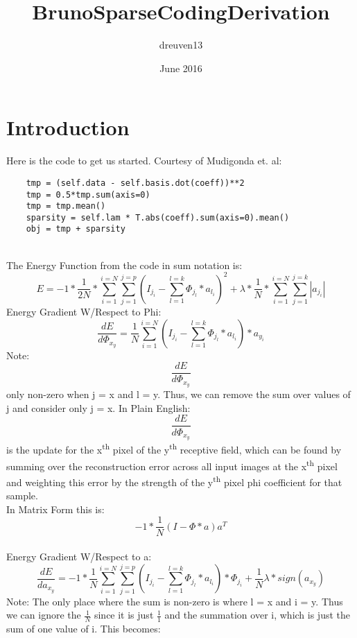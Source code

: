 \documentclass{article}
\title{BrunoSparseCodingDerivation}
\author{dreuven13 }
\date{June 2016}
\begin{document}
\maketitle

\section{Introduction}
Here is the code to get us started. Courtesy of Mudigonda et. al:
\begin{lstlisting}
    tmp = (self.data - self.basis.dot(coeff))**2
    tmp = 0.5*tmp.sum(axis=0)
    tmp = tmp.mean()
    sparsity = self.lam * T.abs(coeff).sum(axis=0).mean()
    obj = tmp + sparsity
\end{lstlisting}\\
\newcommand{\ErrorFunc}{\sum_{j=1}^{j=p}(I_j_i - \sum_{l=1}^{l=k}\Phi_j_l * a_l_i)}
\newcommand{\ErrFSinJ}{(I_j_i - \sum_{l=1}^{l=k}\Phi_j_l * a_l_i)}
The Energy Function from the code in sum notation is:
\begin{equation}
    E = -1 * \frac{1}{2N} *  \sum_{i=1}^{i=N}\ErrorFunc^2  + \lambda * \frac{1}{N} *  \sum_{i=1}^{i=N}\sum_{j=1}^{j=k}|a_j_i|
\end{equation}
Energy Gradient W/Respect to Phi: \\
\begin{equation}
    \frac{dE}{d\Phi_x_y} = \frac{1}{N}\sum_{i=1}^{i=N}\ErrFSinJ * a_y_i
\end{equation}
Note:  \[\frac{dE}{d\Phi_x_y}\] only non-zero when j = x and l = y. Thus, we can remove the sum over values of j and consider only j = x.
In Plain English:\\
\[\frac{dE}{d\Phi_x_y}\] is the update for the x\textsuperscript{th} pixel of the y\textsuperscript{th} receptive field, which can be found by summing over the reconstruction error across all input images at the x\textsuperscript{th} pixel and weighting this error by the strength of the y\textsuperscript{th} pixel phi coefficient for that sample.\\
In Matrix Form this is:
\begin{equation}
    -1 * \frac{1}{N}(I - \Phi * a)a^T
\end{equation}
\\
Energy Gradient W/Respect to a:
\begin{equation}
    \frac{dE}{da_x_y} = -1 * \frac{1}{N}\sum_{i=1}^{i=N}\ErrorFunc*\Phi_j_i + \frac{1}{N}\lambda * sign(a_x_y)
\end{equation}
Note: The only place where the sum is non-zero is where l = x and i = y. Thus we can ignore the $\frac{1}{N}$ since it is just $\frac{1}{1}$ and the summation over i, which is just the sum of one value of i. This becomes:
\end{document}
